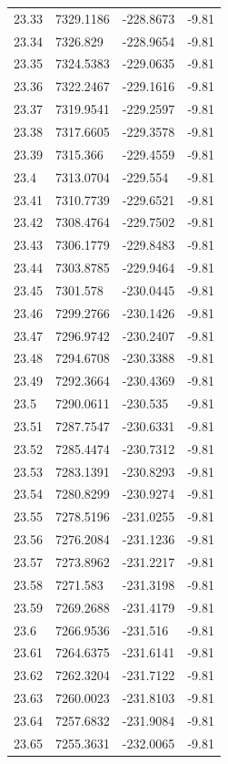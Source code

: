 \begin{table}[H]
\begin{tabular}{llll}
23.33 & 7329.1186 & -228.8673 & -9.81 \\
23.34 & 7326.829 & -228.9654 & -9.81 \\
23.35 & 7324.5383 & -229.0635 & -9.81 \\
23.36 & 7322.2467 & -229.1616 & -9.81 \\
23.37 & 7319.9541 & -229.2597 & -9.81 \\
23.38 & 7317.6605 & -229.3578 & -9.81 \\
23.39 & 7315.366 & -229.4559 & -9.81 \\
23.4 & 7313.0704 & -229.554 & -9.81 \\
23.41 & 7310.7739 & -229.6521 & -9.81 \\
23.42 & 7308.4764 & -229.7502 & -9.81 \\
23.43 & 7306.1779 & -229.8483 & -9.81 \\
23.44 & 7303.8785 & -229.9464 & -9.81 \\
23.45 & 7301.578 & -230.0445 & -9.81 \\
23.46 & 7299.2766 & -230.1426 & -9.81 \\
23.47 & 7296.9742 & -230.2407 & -9.81 \\
23.48 & 7294.6708 & -230.3388 & -9.81 \\
23.49 & 7292.3664 & -230.4369 & -9.81 \\
23.5 & 7290.0611 & -230.535 & -9.81 \\
23.51 & 7287.7547 & -230.6331 & -9.81 \\
23.52 & 7285.4474 & -230.7312 & -9.81 \\
23.53 & 7283.1391 & -230.8293 & -9.81 \\
23.54 & 7280.8299 & -230.9274 & -9.81 \\
23.55 & 7278.5196 & -231.0255 & -9.81 \\
23.56 & 7276.2084 & -231.1236 & -9.81 \\
23.57 & 7273.8962 & -231.2217 & -9.81 \\
23.58 & 7271.583 & -231.3198 & -9.81 \\
23.59 & 7269.2688 & -231.4179 & -9.81 \\
23.6 & 7266.9536 & -231.516 & -9.81 \\
23.61 & 7264.6375 & -231.6141 & -9.81 \\
23.62 & 7262.3204 & -231.7122 & -9.81 \\
23.63 & 7260.0023 & -231.8103 & -9.81 \\
23.64 & 7257.6832 & -231.9084 & -9.81 \\
23.65 & 7255.3631 & -232.0065 & -9.81 \\

\end{tabular}
\end{table}
